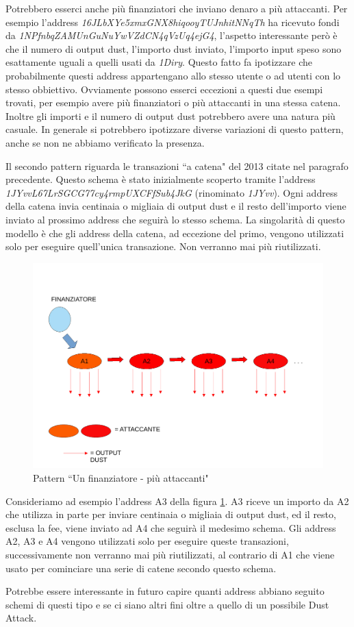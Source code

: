 Potrebbero esserci anche più finanziatori che inviano denaro a più attaccanti. Per esempio l'address \textit{16JLbXYe5xmxGNX8hiqooyTUJnhitNNqTh} ha ricevuto fondi da \textit{1NPfnbqZAMUnGuNuYwVZdCN4qVzUq4ejG4}, l'aspetto interessante però è che il numero di output dust, l'importo dust inviato, l'importo input speso sono esattamente uguali a quelli usati da \textit{1Diry}. Questo fatto fa ipotizzare che probabilmente questi address appartengano allo stesso utente o ad utenti con lo stesso obbiettivo. Ovviamente possono esserci eccezioni a questi due esempi trovati, per esempio avere più finanziatori o più attaccanti in una stessa catena. Inoltre gli importi e il numero di output dust potrebbero avere una natura più casuale. In generale si potrebbero ipotizzare diverse variazioni di questo pattern, anche se non ne abbiamo verificato la presenza.

Il secondo pattern riguarda le transazioni ``a catena" del 2013 citate nel paragrafo precedente. Questo schema è stato inizialmente scoperto tramite l'address \textit{1JYvvL67LrSGCG77cy4rmpUXCFfSub4JkG} (rinominato \textit{1JYvv}). Ogni address della catena invia centinaia o migliaia di output dust e il resto dell'importo viene inviato al prossimo address che seguirà lo stesso schema. La singolarità di questo modello è che gli address della catena, ad eccezione del primo, vengono utilizzati solo per eseguire quell'unica transazione. Non verranno mai più riutilizzati.
\begin{figure}[h!]
    \centering
    \includegraphics[scale=0.4]{Images/dust_attack2.pdf}
    \caption{Pattern ``Un finanziatore - più attaccanti"}
    \label{fig:schema2}
\end{figure}
\FloatBarrier
Consideriamo ad esempio l'address A3 della figura \ref{fig:schema2}. A3 riceve un importo da A2 che utilizza in parte per inviare centinaia o migliaia di output dust, ed il resto, esclusa la fee, viene inviato ad A4 che seguirà il medesimo schema. Gli address A2, A3 e A4 vengono utilizzati solo per eseguire queste transazioni, successivamente non verranno mai più riutilizzati, al contrario di A1 che viene usato per cominciare una serie di catene secondo questo schema.

Potrebbe essere interessante in futuro capire quanti address abbiano seguito schemi di questi tipo e se ci siano altri fini oltre a quello di un possibile Dust Attack.